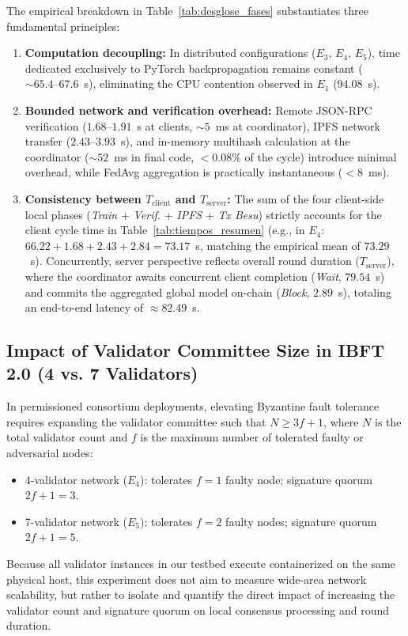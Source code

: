 The empirical breakdown in Table~\ref{tab:desglose_fases} substantiates three fundamental principles:
\begin{enumerate}
    \item \textbf{Computation decoupling:} In distributed configurations ($E_3$, $E_4$, $E_5$), time dedicated exclusively to PyTorch backpropagation remains constant ($\sim 65.4\text{--}67.6$~s), eliminating the CPU contention observed in $E_1$ ($94.08$~s).
    \item \textbf{Bounded network and verification overhead:} Remote JSON-RPC verification ($1.68\text{--}1.91$~s at clients, $\sim 5$~ms at coordinator), IPFS network transfer ($2.43\text{--}3.93$~s), and in-memory multihash calculation at the coordinator ($\sim 52$~ms in final code, $<0.08\%$ of the cycle) introduce minimal overhead, while FedAvg aggregation is practically instantaneous ($< 8$~ms).
    \item \textbf{Consistency between $T_{\text{client}}$ and $T_{\text{server}}$:} The sum of the four client-side local phases (\textit{Train} + \textit{Verif.} + \textit{IPFS} + \textit{Tx Besu}) strictly accounts for the client cycle time in Table~\ref{tab:tiempos_resumen} (e.g., in $E_4$: $66.22 + 1.68 + 2.43 + 2.84 = 73.17$~s, matching the empirical mean of $73.29$~s). Concurrently, server perspective reflects overall round duration ($T_{\text{server}}$), where the coordinator awaits concurrent client completion (\textit{Wait}, $79.54$~s) and commits the aggregated global model on-chain (\textit{Block}, $2.89$~s), totaling an end-to-end latency of $\approx 82.49$~s.
\end{enumerate}

\subsection{Impact of Validator Committee Size in IBFT 2.0 (4 vs. 7 Validators)}
In permissioned consortium deployments, elevating Byzantine fault tolerance requires expanding the validator committee such that $N \ge 3f + 1$, where $N$ is the total validator count and $f$ is the maximum number of tolerated faulty or adversarial nodes:
\begin{itemize}
    \item 4-validator network ($E_4$): tolerates $f=1$ faulty node; signature quorum $2f+1 = 3$.
    \item 7-validator network ($E_5$): tolerates $f=2$ faulty nodes; signature quorum $2f+1 = 5$.
\end{itemize}
Because all validator instances in our testbed execute containerized on the same physical host, this experiment does not aim to measure wide-area network scalability, but rather to isolate and quantify the direct impact of increasing the validator count and signature quorum on local consensus processing and round duration.

